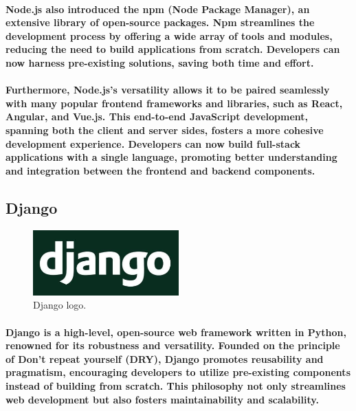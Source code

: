 \documentclass[12pt,a4paper]{article}
\begin{document}
    \paragraph{Node.js also introduced the npm (Node Package Manager), an extensive library of open-source packages. Npm streamlines the development process by offering a wide array of tools and modules, reducing the need to build applications from scratch. Developers can now harness pre-existing solutions, saving both time and effort.}
    
    \paragraph{Furthermore, Node.js’s versatility allows it to be paired seamlessly with many popular frontend frameworks and libraries, such as React, Angular, and Vue.js. This end-to-end JavaScript development, spanning both the client and server sides, fosters a more cohesive development experience. Developers can now build full-stack applications with a single language, promoting better understanding and integration between the frontend and backend components.}

    \subsection{Django}

    \begin{figure}[h!]
      \centering
      \includegraphics[width=0.5\textwidth]{django.png}
      \caption{Django logo.}
    \end{figure}

    \paragraph{Django is a high-level, open-source web framework written in Python, renowned for its robustness and versatility. Founded on the principle of Don’t repeat yourself (DRY), Django promotes reusability and pragmatism, encouraging developers to utilize pre-existing components instead of building from scratch. This philosophy not only streamlines web development but also fosters maintainability and scalability.}
    
\end{document}

